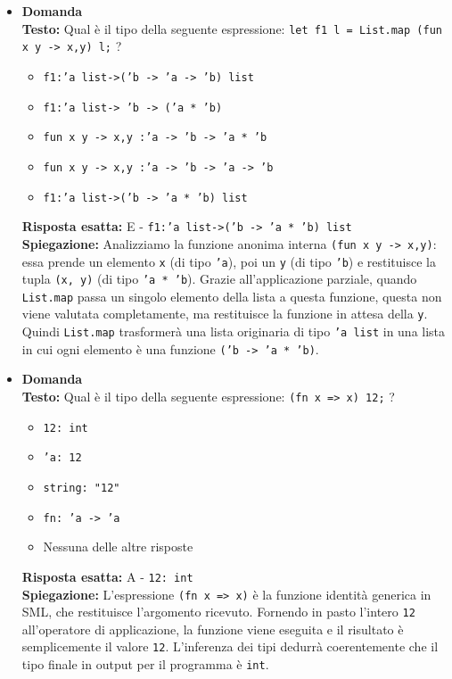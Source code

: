\documentclass[12pt, a4paper]{article}
\newcounter{domandateoria}
\begin{document}
\begin{itemize}
    \item {}\textbf{Domanda \thedomandateoria} \\
    \textbf{Testo:} Qual è il tipo della seguente espressione: \texttt{let f1 l = List.map (fun x y -> x,y) l;} ?
    \begin{itemize}
        \item[A)] \texttt{f1:'a list->('b -> 'a -> 'b) list}
        \item[B)] \texttt{f1:'a list-> 'b -> ('a * 'b)}
        \item[C)] \texttt{fun x y -> x,y :'a -> 'b -> 'a * 'b}
        \item[D)] \texttt{fun x y -> x,y :'a -> 'b -> 'a -> 'b}
        \item[E)] \texttt{f1:'a list->('b -> 'a * 'b) list}
    \end{itemize}
    \textbf{Risposta esatta:} E - \texttt{f1:'a list->('b -> 'a * 'b) list} \\
    \textbf{Spiegazione:} Analizziamo la funzione anonima interna \texttt{(fun x y -> x,y)}: essa prende un elemento \texttt{x} (di tipo \texttt{'a}), poi un \texttt{y} (di tipo \texttt{'b}) e restituisce la tupla \texttt{(x, y)} (di tipo \texttt{'a * 'b}). Grazie all'applicazione parziale, quando \texttt{List.map} passa un singolo elemento della lista a questa funzione, questa non viene valutata completamente, ma restituisce la funzione in attesa della \texttt{y}. Quindi \texttt{List.map} trasformerà una lista originaria di tipo \texttt{'a list} in una lista in cui ogni elemento è una funzione \texttt{('b -> 'a * 'b)}.
    \vspace{0.3cm}

\newpage

    \item {}\textbf{Domanda \thedomandateoria} \\
    \textbf{Testo:} Qual è il tipo della seguente espressione: \texttt{(fn x => x) 12;} ?
    \begin{itemize}
        \item[A)] \texttt{12: int}
        \item[B)] \texttt{'a: 12}
        \item[C)] \texttt{string: "12"}
        \item[D)] \texttt{fn: 'a -> 'a}
        \item[E)] Nessuna delle altre risposte
    \end{itemize}
    \textbf{Risposta esatta:} A - \texttt{12: int} \\
    \textbf{Spiegazione:} L'espressione \texttt{(fn x => x)} è la funzione identità generica in SML, che restituisce l'argomento ricevuto. Fornendo in pasto l'intero \texttt{12} all'operatore di applicazione, la funzione viene eseguita e il risultato è semplicemente il valore \texttt{12}. L'inferenza dei tipi dedurrà coerentemente che il tipo finale in output per il programma è \texttt{int}.
    \vspace{0.3cm}


\end{itemize}
\end{document}
